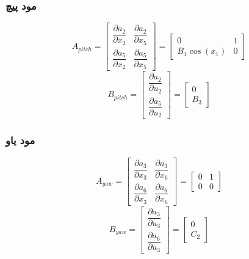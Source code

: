 \subsubsection{مود پیچ}
\begin{equation}
	A_{pitch} = \begin{bmatrix}
		\dfrac{\partial  a_2}{\partial  x_2}& \dfrac{\partial  a_2}{\partial  x_5}
		\\[1em]
		\dfrac{\partial  a_5}{\partial  x_2}& \dfrac{\partial  a_5}{\partial  x_5}
	\end{bmatrix} = 
	\begin{bmatrix}
		0 & 1\\
		B_1\cos(x_1) & 0
	\end{bmatrix}
\end{equation}
\begin{equation}
	B_{pitch} = \begin{bmatrix}
		\dfrac{\partial  a_2}{\partial  u_2}
		\\[1em]
		\dfrac{\partial  a_5}{\partial  u_2}
	\end{bmatrix} = 
	\begin{bmatrix}
		0\\
		B_3
	\end{bmatrix}
\end{equation}
\subsubsection{مود یاو}
\begin{equation}
	A_{yaw} = \begin{bmatrix}
		\dfrac{\partial  a_3}{\partial  x_3}& \dfrac{\partial  a_3}{\partial  x_6}
		\\[1em]
		\dfrac{\partial  a_6}{\partial  x_3}& \dfrac{\partial  a_6}{\partial  x_6}
	\end{bmatrix} = 
	\begin{bmatrix}
		0 & 1\\
		0 & 0
	\end{bmatrix}
\end{equation}
\begin{equation}
	B_{yaw} = \begin{bmatrix}
		\dfrac{\partial  a_3}{\partial  u_3}
		\\[1em]
		\dfrac{\partial  a_6}{\partial  u_3}
	\end{bmatrix} = 
	\begin{bmatrix}
		0\\
		C_2
	\end{bmatrix}
\end{equation}
